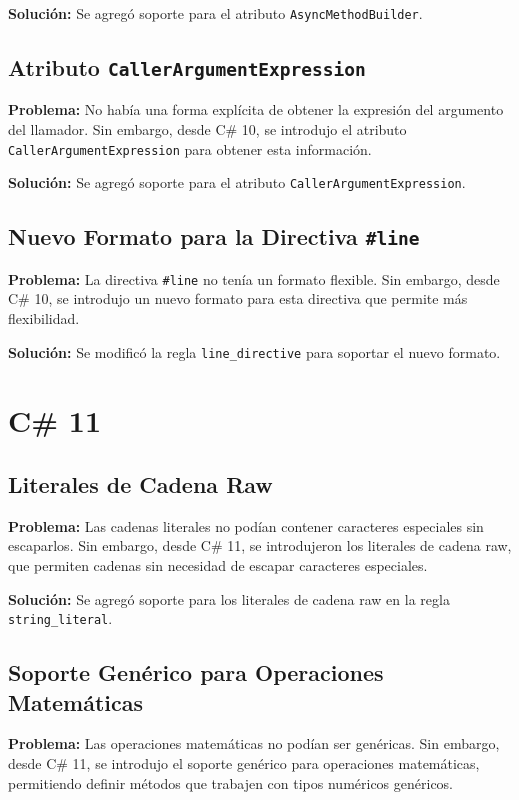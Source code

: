 \textbf{Solución:} Se agregó soporte para el atributo \texttt{AsyncMethodBuilder}.

\subsection*{Atributo \texttt{CallerArgumentExpression}}
\textbf{Problema:} No había una forma explícita de obtener la expresión del argumento del llamador. Sin embargo, desde C\# 10, se introdujo el atributo \texttt{CallerArgumentExpression} para obtener esta información.

\textbf{Solución:} Se agregó soporte para el atributo \texttt{CallerArgumentExpression}.

\subsection*{Nuevo Formato para la Directiva \texttt{\#line}}
\textbf{Problema:} La directiva \texttt{\#line} no tenía un formato flexible. Sin embargo, desde C\# 10, se introdujo un nuevo formato para esta directiva que permite más flexibilidad.

\textbf{Solución:} Se modificó la regla \texttt{line\_directive} para soportar el nuevo formato.


\section*{C\# 11}

\subsection*{Literales de Cadena Raw}

\textbf{Problema:} Las cadenas literales no podían contener caracteres especiales sin escaparlos. Sin embargo, desde C\# 11, se introdujeron los literales de cadena raw, que permiten cadenas sin necesidad de escapar caracteres especiales.

\textbf{Solución:} Se agregó soporte para los literales de cadena raw en la regla \texttt{string\_literal}.

\subsection*{Soporte Genérico para Operaciones Matemáticas}

\textbf{Problema:} Las operaciones matemáticas no podían ser genéricas. Sin embargo, desde C\# 11, se introdujo el soporte genérico para operaciones matemáticas, permitiendo definir métodos que trabajen con tipos numéricos genéricos.

